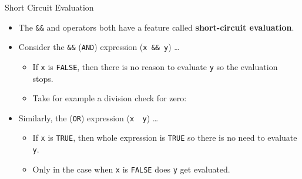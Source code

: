 \begin{frame}[fragile]{Short Circuit Evaluation}

\begin{itemize}
\tightlist
\item
  The \texttt{\&\&} and \texttt{\textbar{}\textbar{}} operators both
  have a feature called \textbf{short-circuit evaluation}.
\item
  Consider the \texttt{\&\&} (\texttt{AND}) expression
  (\texttt{x\ \&\&\ y}) \ldots{}

  \begin{itemize}
  \tightlist
  \item
    If \texttt{x} is \texttt{FALSE}, then there is no reason to evaluate
    \texttt{y} so the evaluation stops.
  \item
    Take for example a division check for zero:
  \end{itemize}
\end{itemize}

\begin{Shaded}
\begin{Highlighting}[]
\StringTok{ }\StringTok{ }         
\StringTok{ } \NormalTok{&&}\StringTok{  }\StringTok{ }\NormalTok{) }
\end{Highlighting}
\end{Shaded}

\begin{itemize}
\tightlist
\item
  Similarly, the \texttt{\textbar{}\textbar{}} (\texttt{OR}) expression
  (\texttt{x\ \textbar{}\textbar{}\ y}) \ldots{}

  \begin{itemize}
  \tightlist
  \item
    If \texttt{x} is \texttt{TRUE}, then whole expression is
    \texttt{TRUE} so there is no need to evaluate \texttt{y}.
  \item
    Only in the case when \texttt{x} is \texttt{FALSE} does \texttt{y}
    get evaluated.
  \end{itemize}
\end{itemize}

\end{frame}

